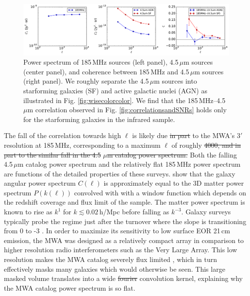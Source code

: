\documentclass[numberedappendix]{emulateapj}
\providecommand{\DIFadd}[1]{{\protect\color{blue}\uwave{#1}}} %
\providecommand{\DIFdel}[1]{{\protect\color{red}\sout{#1}}}                      %
\providecommand{\DIFaddbegin}{} %
\providecommand{\DIFaddend}{} %
\providecommand{\DIFdelbegin}{} %
\providecommand{\DIFdelend}{} %
\begin{document}
\begin{figure}[h]
\centering
\includegraphics[width=7in]{mwa_wise_qsoagn_gal_xspec.pdf}
\caption[Auto and cross spectra of 185\,MHz and 4.5\,$\mu$m sources, for both AGN and SF cuts of the infrared catalog.]{Power spectrum of 185\,MHz sources (left panel), 4.5\,$\mu$m sources (center panel), and coherence between 185\,MHz and 4.5\,$\mu$m sources (right panel). We roughly separate the 4.5\,$\mu$m sources into starforming galaxies (SF) and active galactic nuclei (AGN) as illustrated in Fig.  \ref{fig:wisecolorcolor}. We find that the 185\,MHz--4.5\,$\mu$m correlation observed in Fig. \ref{fig:correlationsandSNRs} holds only for the starforming galaxies in the infrared sample. }
\label{fig:wisexspec}
\end{figure}

The fall of the correlation towards high $\ell$ is likely due \DIFdelbegin \DIFdel{in part }\DIFdelend to the MWA's $3'$ resolution at 185\,MHz, corresponding to a maximum $\ell$ of roughly \DIFdelbegin \DIFdel{4000, and in part to the similar fall in the 4.5}%
\DIFdel{$\mu$m catalog power spectrum. }\DIFdelend \DIFaddbegin \DIFadd{4000. }\DIFaddend Both the falling 4.5\,$\mu$m catalog power spectrum and the relatively flat 185\,MHz power spectrum are functions of the detailed properties of these surveys. \citet{tegmark02,dodelson02} show that the galaxy angular power spectrum $C(\ell)$ is approximately equal to the 3D matter power spectrum $P(k(\ell))$ convolved with with a window function which depends on the redshift coverage and flux limit of the sample. The matter power spectrum is known to rise as $k^{1}$ for $k\lesssim0.02$\,h/Mpc before falling as $k^{-3}$. Galaxy surveys typically probe the regime just after the turnover where the slope is transitioning from 0 to -3 \citep{tegmark02b}. In order to maximize its sensitivity to low surface EOR 21\,cm emission, the MWA was designed as a relatively compact array in comparison to higher resolution radio interferometers such as the Very Large Array. This low resolution makes the MWA catalog severely flux limited \citep{PattiCatalog1}, which in turn effectively masks many galaxies which would otherwise be seen. This large masked volume translates into a wide \DIFdelbegin \DIFdel{fourier }\DIFdelend \DIFaddbegin \DIFadd{Fourier }\DIFaddend convolution kernel, explaining why the MWA catalog power spectrum is so flat. 
\end{document}
